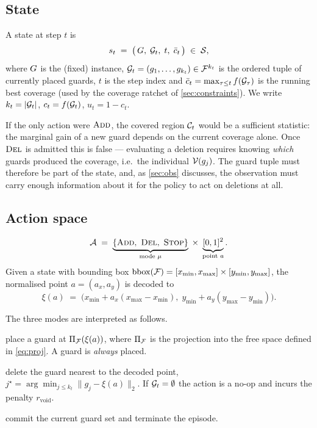 \documentclass[11pt,a4paper]{article}
\begin{document}
\subsection{State}

\begin{definition}[State]\label{def:state}
A state at step $t$ is
\[
  s_t \;=\; \bigl(\, G,\; \mathcal{G}_t,\; t,\; \bar{c}_t \,\bigr)
  \;\in\; \mathcal{S},
\]
where $G$ is the (fixed) instance, $\mathcal{G}_t = (g_1,\dots,g_{k_t}) \in \mathcal{F}^{k_t}$
is the ordered tuple of currently placed guards, $t$ is the step index and
$\bar{c}_t = \max_{\tau \le t} f(\mathcal{G}_\tau)$ is the running best coverage
(used by the coverage ratchet of \cref{sec:constraints}). We write
$k_t = |\mathcal{G}_t|$, $c_t = f(\mathcal{G}_t)$, $u_t = 1 - c_t$.
\end{definition}

\begin{remark}
If the only action were $\ADD$, the covered region $\mathcal{C}_t$ would be a sufficient statistic:
the marginal gain of a new guard depends on the current coverage alone. Once $\DEL$ is
admitted this is false --- evaluating a deletion requires knowing \emph{which} guards
produced the coverage, i.e.\ the individual $\mathcal{V}(g_j)$. The guard tuple must therefore be
part of the state, and, as \cref{sec:obs} discusses, the observation must carry enough
information about it for the policy to act on deletions at all.
\end{remark}

\subsection{Action space}

\begin{definition}\label{def:action}
\[
  \Aspace \;=\; \underbrace{\{\ADD,\ \DEL,\ \STOP\}}_{\text{mode } \mu}
  \;\times\;
  \underbrace{[0,1]^2}_{\text{point } a}.
\]
Given a state with bounding box $\operatorname{bbox}(\mathcal{F}) = [x_{\min},x_{\max}] \times
[y_{\min},y_{\max}]$, the normalised point $a = (a_x,a_y)$ is decoded to
\[
  \xi(a) \;=\; \bigl(x_{\min} + a_x (x_{\max}-x_{\min}),\; y_{\min} + a_y (y_{\max}-y_{\min})\bigr).
\]
\end{definition}

The three modes are interpreted as follows.

\begin{description}[style=nextline,leftmargin=1.2em]
  \item[$\ADD$:] place a guard at $\Pi_{\mathcal{F}}(\xi(a))$, where $\Pi_{\mathcal{F}}$ is the projection into the
        free space defined in \cref{eq:proj}. A guard is \emph{always} placed.
  \item[$\DEL$:] delete the guard nearest to the decoded point,
        $j^\star = \arg\min_{j \le k_t} \lVert g_j - \xi(a) \rVert_2$. If $\mathcal{G}_t = \emptyset$
        the action is a no-op and incurs the penalty $r_{\mathrm{void}}$.
  \item[$\STOP$:] commit the current guard set and terminate the episode.
\end{description}
\end{document}
